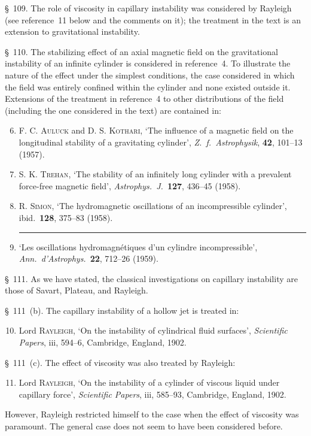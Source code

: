 \S~109. The role of viscosity in capillary instability was considered by Rayleigh (see reference~11 below and the comments on it); the treatment in the text is an extension to gravitational instability.

\S~110. The stabilizing effect of an axial magnetic field on the gravitational instability of an infinite cylinder is considered in reference~4. To illustrate the nature of the effect under the simplest conditions, the case considered in which the field was entirely confined within the cylinder and none existed outside it. Extensions of the treatment in reference~4 to other distributions of the field (including the one considered in the text) are contained in:
\begin{enumerate}
\setcounter{enumi}{5}
\item F. C. \textsc{Auluck} and D. S. \textsc{Kothari}, `The influence of a magnetic field on the longitudinal stability of a gravitating cylinder', \emph{Z.\ f.\ Astrophysik}, \textbf{42}, 101--13 (1957).

\item S. K. \textsc{Trehan}, `The stability of an infinitely long cylinder with a prevalent force-free magnetic field', \emph{Astrophys.\ J.}\ \textbf{127}, 436--45 (1958).

\item R. \textsc{Simon}, `The hydromagnetic oscillations of an incompressible cylinder', ibid.\ \textbf{128}, 375--83 (1958).

\item \rule{1cm}{0.4pt} `Les oscillations hydromagn\'etiques d'un cylindre incompressible', \emph{Ann.\ d'Astrophys.}\ \textbf{22}, 712--26 (1959).
\end{enumerate}

\S~111. As we have stated, the classical investigations on capillary instability are those of Savart, Plateau, and Rayleigh.

\S~111~(b). The capillary instability of a hollow jet is treated in:
\begin{enumerate}
\setcounter{enumi}{9}
\item Lord \textsc{Rayleigh}, `On the instability of cylindrical fluid surfaces', \emph{Scientific Papers}, iii, 594--6, Cambridge, England, 1902.
\end{enumerate}

\S~111~(c). The effect of viscosity was also treated by Rayleigh:
\begin{enumerate}
\setcounter{enumi}{10}
\item Lord \textsc{Rayleigh}, `On the instability of a cylinder of viscous liquid under capillary force', \emph{Scientific Papers}, iii, 585--93, Cambridge, England, 1902.
\end{enumerate}
However, Rayleigh restricted himself to the case when the effect of viscosity was paramount. The general case does not seem to have been considered before.

